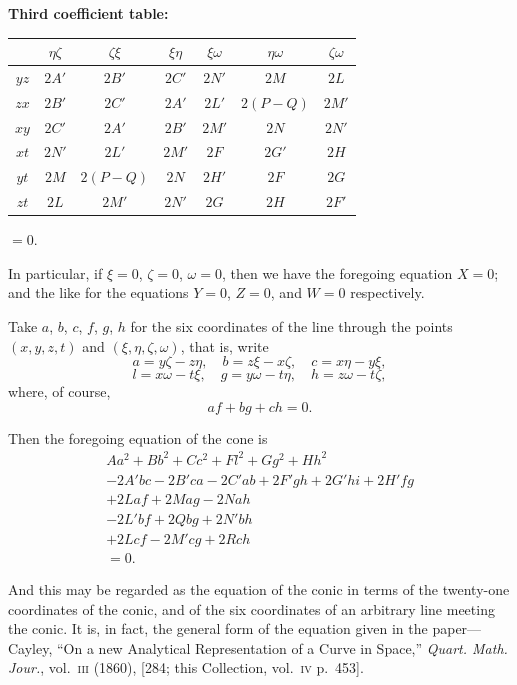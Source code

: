 \documentclass[12pt,a4paper]{article}
\theoremstyle{plain}
\begin{document}
\begin{center}
\textbf{Third coefficient table:}
\end{center}
\begin{center}
\begin{tabular}{c|cccccc}
& $\eta\zeta$ & $\zeta\xi$ & $\xi\eta$ & $\xi\omega$ & $\eta\omega$ & $\zeta\omega$ \\
\hline
$yz$ & $2A'$ & $2B'$ & $2C'$ & $2N'$ & $2M$ & $2L$ \\
$zx$ & $2B'$ & $2C'$ & $2A'$ & $2L'$ & $2(P-Q)$ & $2M'$ \\
$xy$ & $2C'$ & $2A'$ & $2B'$ & $2M'$ & $2N$ & $2N'$ \\
$xt$ & $2N'$ & $2L'$ & $2M'$ & $2F$ & $2G'$ & $2H$ \\
$yt$ & $2M$ & $2(P-Q)$ & $2N$ & $2H'$ & $2F$ & $2G$ \\
$zt$ & $2L$ & $2M'$ & $2N'$ & $2G$ & $2H$ & $2F'$
\end{tabular}
\end{center}

\vspace{0.5em}
\begin{center}
$=0$.
\end{center}

In particular, if $\xi=0$, $\zeta=0$, $\omega=0$, then we have the foregoing equation
$X=0$; and the like for the equations $Y=0$, $Z=0$, and $W=0$ respectively.

Take $a$, $b$, $c$, $f$, $g$, $h$ for the six coordinates of the line through
the points $(x,y,z,t)$ and $(\xi,\eta,\zeta,\omega)$, that is, write
\[
a = y\zeta - z\eta,\quad
b = z\xi - x\zeta,\quad
c = x\eta - y\xi,
\]
\[
l = x\omega - t\xi,\quad
g = y\omega - t\eta,\quad
h = z\omega - t\zeta,
\]
where, of course,
\[
af+bg+ch = 0.
\]

Then the foregoing equation of the cone is
\begin{multline*}
Aa^2+Bb^2+Cc^2+Fl^2+Gg^2+Hh^2\\
-2A'bc-2B'ca-2C'ab+2F'gh+2G'hi+2H'fg\\
+2Laf+2Mag-2Nah\\
-2L'bf+2Qbg+2N'bh\\
+2Lcf-2M'cg+2Rch\\
=0.
\end{multline*}

And this may be regarded as the equation of the conic in terms of the
twenty-one coordinates of the conic, and of the six coordinates of an
arbitrary line meeting the conic. It is, in fact, the general form of the
equation given in the paper---Cayley, ``On a new Analytical Representation
of a Curve in Space,'' \textit{Quart. Math. Jour.}, vol.~\textsc{iii} (1860),
[284; this Collection, vol.~\textsc{iv} p.~453].
\end{document}
